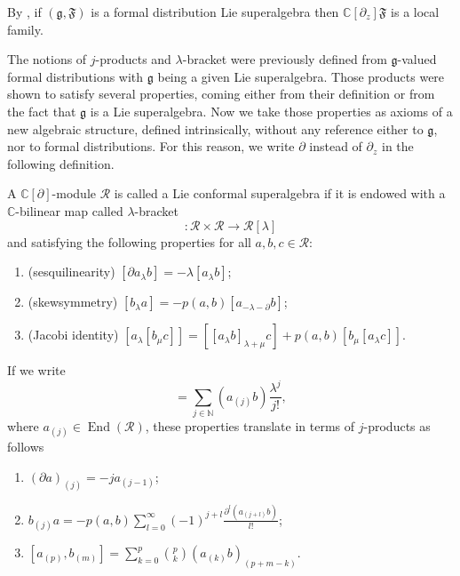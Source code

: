 \documentclass[a4paper, 12pt, reqno]{amsart}
\theoremstyle{remark}
\numberwithin{equation}{subsection}
\DeclareMathOperator{\End}{End}
\begin{document}
By , if $(\mathfrak{g}, \mathfrak{F})$ is a formal distribution Lie superalgebra then $\mathbb{C}[\partial_z]\mathfrak{F}$ is a local family.

The notions of $j$-products and $\lambda$-bracket were previously defined from $\mathfrak{g}$-valued formal distributions with $\mathfrak{g}$ being a given Lie superalgebra.
Those products were shown to satisfy several properties, coming either from their definition or from the fact that $\mathfrak{g}$ is a Lie superalgebra.
Now we take those properties as axioms of a new algebraic structure, defined intrinsically, without any reference either to $\mathfrak{g}$, nor to formal distributions.
For this reason, we write $\partial$ instead of $\partial_z$ in the following definition.

A $\mathbb{C}[\partial]$-module $\mathcal{R}$ is called a Lie conformal superalgebra if it is endowed with a $\mathbb{C}$-bilinear map called $\lambda$-bracket
\begin{equation*}
  [\bullet_{\lambda}\bullet]: \mathcal{R}\times\mathcal{R} \to \mathcal{R}[\lambda]
\end{equation*}
and satisfying the following properties for all $a, b, c \in \mathcal{R}$:
\begin{enumerate}
\item (sesquilinearity) $[\partial a_{\lambda}b] = -\lambda[a_{\lambda}b]$;
\item (skewsymmetry) $[b_{\lambda}a] = -p(a, b)[a_{-\lambda - \partial}b]$;
\item (Jacobi identity) $[a_{\lambda}[b_{\mu}c]] = [[a_{\lambda}b]_{\lambda +\mu}c] + p(a, b)[b_{\mu}[a_{\lambda}c]]$.
\end{enumerate}

If we write
\begin{equation*}
  [a_{\lambda}b] = \sum_{j \in \mathbb{N}}(a_{(j)}b)\frac{\lambda^j}{j!},
\end{equation*}
where $a_{(j)} \in \End(\mathcal{R})$, these properties translate in terms of $j$-products as follows
\begin{enumerate}[label = (\alph*)]
\item $(\partial a)_{(j)} = -j a_{(j - 1)}$; 
\item $b_{(j)}a = -p(a,b)\sum_{l = 0}^\infty(-1)^{j + l}\frac{\partial^l(a_{(j + l)}b)}{l!}$;
\item $[a_{(p)},b_{(m)}] = \sum_{k = 0}^p\binom{p}{k}(a_{(k)}b)_{(p + m - k)}$.
\end{enumerate}
\end{document}
